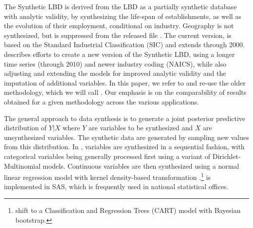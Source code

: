 

The Synthetic LBD is derived from the LBD as a partially synthetic database with analytic validity, by synthesizing the life-span of establishments, as well as the evolution of their employment, conditional on industry. Geography is not synthesized, but is suppressed from the released file \citep{RePEc:cen:tnotes:11-01}. The current version, is based on the Standard Industrial Classification (SIC) and extends through 2000. \citet{RePEc:cen:wpaper:14-12} describes efforts to create a new version of the Synthetic LBD, using a longer time  series (through 2010) and newer industry coding (NAICS), while also adjusting and extending the models for  improved  analytic validity and  the imputation of additional variables. In this paper, we refer to and re-use the older methodology, which we will call \SynLBD. Our emphasis is on the comparability of results obtained for a given methodology across the various applications.
  

The general approach to data synthesis is to generate a joint posterior predictive distribution of $Y|X$ where $Y$ are variables to be synthesized and $X$ are unsynthesized variables. The synthetic data are generated by sampling new values from this distribution. In \SynLBD, variables are synthesized in a sequential fashion, with categorical variables being generally processed first using a variant of Dirichlet-Multinomial models. Continuous variables are then synthesized using a normal linear regression model with kernel density-based transformation \citep{WOODCOCK20094228}.\footnote{\textcite{RePEc:cen:wpaper:14-12} shift  to a Classification and Regression Trees (CART) model with Bayesian bootstrap. } \SynLBD{} is implemented in SAS\texttrademark, which is frequently used in national statistical offices.


